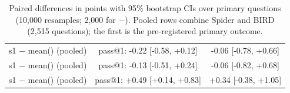 \begin{table}[t]
{\begin{tabular}{@{}lccccc@{}}
\armG{} s1 $-$ mean(\armA{}) (pooled) & \multicolumn{4}{c}{pass@1: -0.22 [-0.58, +0.12]} & -0.06 [-0.78, +0.66] \\
\armF{} s1 $-$ mean(\armA{}) (pooled) & \multicolumn{4}{c}{pass@1: -0.13 [-0.51, +0.24]} & -0.06 [-0.82, +0.68] \\
\armC{} s1 $-$ mean(\armA{}) (pooled) & \multicolumn{4}{c}{pass@1: +0.49 [+0.14, +0.83]} & +0.34 [-0.38, +1.05] \\
\bottomrule
\end{tabular}}
\caption{Paired differences in points with 95\% bootstrap CIs over primary questions (10,000 resamples; 2,000 for \armC{}$-$\armB{}). Pooled rows combine Spider and BIRD (2,515 questions); the first is the pre-registered primary outcome.}
\label{tab:pairs}
\end{table}
